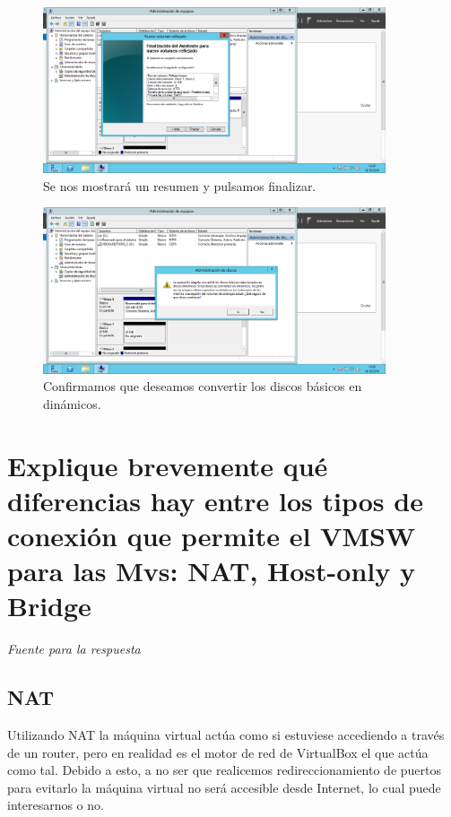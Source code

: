 {\begin{figure}[H]
	\centering
	\includegraphics[width=0.9\textwidth]{raid1-7.png}
	\caption{Se nos mostrará un resumen y pulsamos finalizar.}
\end{figure}
\begin{figure}[H]
	\centering
	\includegraphics[width=0.9\textwidth]{raid1-8.png}
	\caption{Confirmamos que deseamos convertir los discos básicos en dinámicos.}
\end{figure}


\section{Explique brevemente qué diferencias hay entre los tipos de conexión que permite el VMSW para las Mvs: NAT, Host-only y Bridge}

\textit{Fuente para la respuesta \cite{c14}}

\subsection{NAT}
Utilizando NAT la máquina virtual actúa como si estuviese accediendo a través de un router, pero en realidad es el motor de red de VirtualBox el que actúa como tal. Debido a esto, a no ser que realicemos redireccionamiento de puertos para evitarlo la máquina virtual no será accesible desde Internet, lo cual puede interesarnos o no.

}
